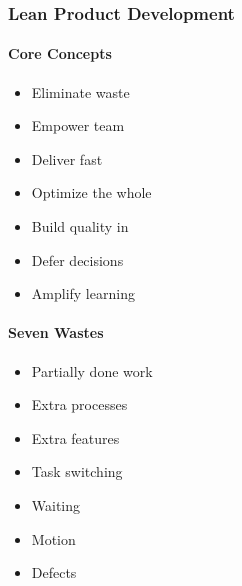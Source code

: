 \documentclass[letterpaper,10pt,english]{jupyterBook}
\begin{document}
\subsubsection{Lean Product Development}
\label{\detokenize{APM/agile:lean-product-development}}

\paragraph{Core Concepts}
\label{\detokenize{APM/agile:core-concepts}}\begin{itemize}
\item {} 
\sphinxAtStartPar
Eliminate waste

\item {} 
\sphinxAtStartPar
Empower team

\item {} 
\sphinxAtStartPar
Deliver fast

\item {} 
\sphinxAtStartPar
Optimize the whole

\item {} 
\sphinxAtStartPar
Build quality in

\item {} 
\sphinxAtStartPar
Defer decisions

\item {} 
\sphinxAtStartPar
Amplify learning

\end{itemize}


\paragraph{Seven Wastes}
\label{\detokenize{APM/agile:seven-wastes}}\begin{itemize}
\item {} 
\sphinxAtStartPar
Partially done work

\item {} 
\sphinxAtStartPar
Extra processes

\item {} 
\sphinxAtStartPar
Extra features

\item {} 
\sphinxAtStartPar
Task switching

\item {} 
\sphinxAtStartPar
Waiting

\item {} 
\sphinxAtStartPar
Motion

\item {} 
\sphinxAtStartPar
Defects

\end{itemize}
\end{document}
